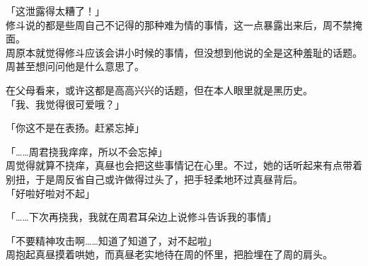 「这泄露得太糟了！」\\

修斗说的都是些周自己不记得的那种难为情的事情，这一点暴露出来后，周不禁掩面。\\

周原本就觉得修斗应该会讲小时候的事情，但没想到他说的全是这种羞耻的话题。周甚至想问问他是什么意思了。

在父母看来，或许这都是高高兴兴的话题，但在本人眼里就是黑历史。\\

「我、我觉得很可爱哦？」

「你这不是在表扬。赶紧忘掉」

「……周君挠我痒痒，所以不会忘掉」\\

周觉得就算不挠痒，真昼也会把这些事情记在心里。不过，她的话听起来有点带着别扭，于是周反省自己或许做得过头了，把手轻柔地环过真昼背后。\\

「好啦好啦对不起」

「……下次再挠我，我就在周君耳朵边上说修斗告诉我的事情」

「不要精神攻击啊……知道了知道了，对不起啦」\\

周抱起真昼摸着哄她，而真昼老实地待在周的怀里，把脸埋在了周的肩头。
